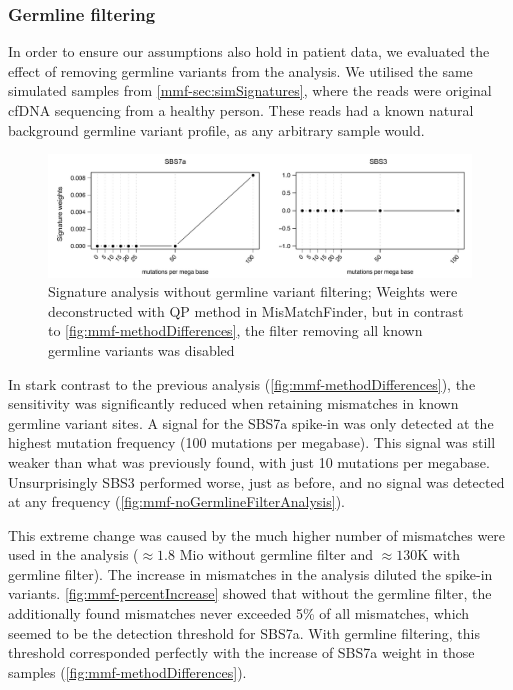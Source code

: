 \subsubsection{Germline filtering}
\label{mmf-sec:germlinefiltering}
In order to ensure our assumptions also hold  in  patient data, we evaluated the effect of removing germline variants from the analysis. We utilised the same simulated samples from \autoref{mmf-sec:simSignatures}, where the reads were original cfDNA sequencing  from a healthy person. These reads had a known natural background germline variant profile, as any arbitrary sample would.

\begin{figure}[ht]
\centering
\includegraphics[width=.99\linewidth]{Figures/MisMatchFinder/noGermlineFilterAnalysis.pdf}
\caption[Signature analysis without germline variant filtering]{Signature analysis without germline variant filtering; Weights were deconstructed with QP method in MisMatchFinder, but in contrast to \protect\autoref{fig:mmf-methodDifferences}, the filter removing all known germline variants was disabled}\label{fig:mmf-noGermlineFilterAnalysis}
\end{figure}

In stark contrast to the previous analysis (\autoref{fig:mmf-methodDifferences}), the  sensitivity  was significantly reduced when retaining mismatches in known germline variant sites. A signal for  the SBS7a spike-in was only detected at the  highest mutation frequency (100 mutations per megabase). This signal was still weaker than what was previously found, with just 10 mutations per megabase. Unsurprisingly SBS3 performed worse, just as before, and no signal was detected at any frequency (\autoref{fig:mmf-noGermlineFilterAnalysis}).

This extreme change was caused by the much higher number of mismatches  were used in the analysis ($\approx 1.8$ Mio without germline filter and $\approx 130$K with germline filter).
The increase in mismatches in the analysis diluted the spike-in variants. \autoref{fig:mmf-percentIncrease} showed that without the germline filter, the additionally found mismatches never exceeded 5\% of all mismatches, which seemed to be the detection threshold for SBS7a. With germline filtering, this threshold corresponded perfectly with the increase of SBS7a weight in those samples (\autoref{fig:mmf-methodDifferences}).


